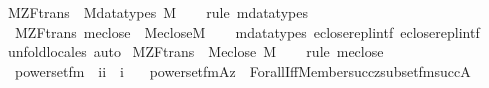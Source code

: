\begin{isabellebody}
\isanewline
%
\endisadelimproof
\isanewline
{}\isamarkupfalse%
\ M{\isacharunderscore}{\kern0pt}ZF{\isacharunderscore}{\kern0pt}trans\ {\isasymsubseteq}\ M{\isacharunderscore}{\kern0pt}datatypes\ {\isachardoublequoteopen}{\isacharhash}{\kern0pt}{\isacharhash}{\kern0pt}M{\isachardoublequoteclose}\isanewline
%
\isadelimproof
\ \ %
\endisadelimproof
%
\isatagproof
{}\isamarkupfalse%
\ {\isacharparenleft}{\kern0pt}rule\ mdatatypes{\isacharparenright}{\kern0pt}%
\endisatagproof
{\isafoldproof}%
%
\isadelimproof
\isanewline
%
\endisadelimproof
\isanewline
{}\isamarkupfalse%
\ {\isacharparenleft}{\kern0pt}\ M{\isacharunderscore}{\kern0pt}ZF{\isacharunderscore}{\kern0pt}trans{\isacharparenright}{\kern0pt}\ meclose\ {\isacharcolon}{\kern0pt}\ {\isachardoublequoteopen}M{\isacharunderscore}{\kern0pt}eclose{\isacharparenleft}{\kern0pt}{\isacharhash}{\kern0pt}{\isacharhash}{\kern0pt}M{\isacharparenright}{\kern0pt}{\isachardoublequoteclose}\isanewline
%
\isadelimproof
\ \ %
\endisadelimproof
%
\isatagproof
{}\isamarkupfalse%
\ mdatatypes\ eclose{\isacharunderscore}{\kern0pt}repl{}{\isacharunderscore}{\kern0pt}intf\ eclose{\isacharunderscore}{\kern0pt}repl{}{\isacharunderscore}{\kern0pt}intf\isanewline
\ \ \isamarkupfalse%
\ unfold{\isacharunderscore}{\kern0pt}locales\ auto%
\endisatagproof
{\isafoldproof}%
%
\isadelimproof
\isanewline
%
\endisadelimproof
\isanewline
{}\isamarkupfalse%
\ M{\isacharunderscore}{\kern0pt}ZF{\isacharunderscore}{\kern0pt}trans\ {\isasymsubseteq}\ M{\isacharunderscore}{\kern0pt}eclose\ {\isachardoublequoteopen}{\isacharhash}{\kern0pt}{\isacharhash}{\kern0pt}M{\isachardoublequoteclose}\isanewline
%
\isadelimproof
\ \ %
\endisadelimproof
%
\isatagproof
{}\isamarkupfalse%
\ {\isacharparenleft}{\kern0pt}rule\ meclose{\isacharparenright}{\kern0pt}%
\endisatagproof
{\isafoldproof}%
%
\isadelimproof
\isanewline
%
\endisadelimproof
\isanewline
\isanewline
\isanewline
\isanewline
{}\isamarkupfalse%
\isanewline
\ \ powerset{\isacharunderscore}{\kern0pt}fm\ {\isacharcolon}{\kern0pt}{\isacharcolon}{\kern0pt}\ {\isachardoublequoteopen}{\isacharbrackleft}{\kern0pt}i{\isacharcomma}{\kern0pt}i{\isacharbrackright}{\kern0pt}\ {\isasymRightarrow}\ i{\isachardoublequoteclose}\ \isanewline
\ \ {\isachardoublequoteopen}powerset{\isacharunderscore}{\kern0pt}fm{\isacharparenleft}{\kern0pt}A{\isacharcomma}{\kern0pt}z{\isacharparenright}{\kern0pt}\ {\isasymequiv}\ Forall{\isacharparenleft}{\kern0pt}Iff{\isacharparenleft}{\kern0pt}Member{\isacharparenleft}{\kern0pt}{}{\isacharcomma}{\kern0pt}succ{\isacharparenleft}{\kern0pt}z{\isacharparenright}{\kern0pt}{\isacharparenright}{\kern0pt}{\isacharcomma}{\kern0pt}subset{\isacharunderscore}{\kern0pt}fm{\isacharparenleft}{\kern0pt}{}{\isacharcomma}{\kern0pt}succ{\isacharparenleft}{\kern0pt}A{\isacharparenright}{\kern0pt}{\isacharparenright}{\kern0pt}{\isacharparenright}{\kern0pt}{\isacharparenright}{\kern0pt}{\isachardoublequoteclose}\isanewline

\end{isabellebody}
